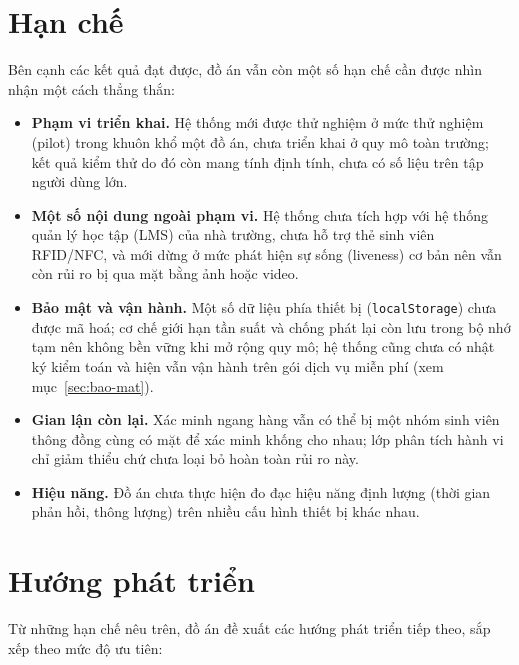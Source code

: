 \documentclass[../main.tex]{subfiles}
\begin{document}
\section{Hạn chế}
\label{sec:han-che}

Bên cạnh các kết quả đạt được, đồ án vẫn còn một số hạn chế cần được nhìn nhận một cách thẳng
thắn:

\begin{itemize}[leftmargin=1.5em]
  \item \textbf{Phạm vi triển khai.} Hệ thống mới được thử nghiệm ở mức thử nghiệm (pilot)
  trong khuôn khổ một đồ án, chưa triển khai ở quy mô toàn trường; kết quả kiểm thử do đó còn
  mang tính định tính, chưa có số liệu trên tập người dùng lớn.

  \item \textbf{Một số nội dung ngoài phạm vi.} Hệ thống chưa tích hợp với hệ thống quản lý
  học tập (LMS) của nhà trường, chưa hỗ trợ thẻ sinh viên RFID/NFC, và mới dừng ở mức phát
  hiện sự sống (liveness) cơ bản nên vẫn còn rủi ro bị qua mặt bằng ảnh hoặc video.

  \item \textbf{Bảo mật và vận hành.} Một số dữ liệu phía thiết bị (\texttt{localStorage})
  chưa được mã hoá; cơ chế giới hạn tần suất và chống phát lại còn lưu trong bộ nhớ tạm nên
  không bền vững khi mở rộng quy mô; hệ thống cũng chưa có nhật ký kiểm toán và hiện vẫn vận
  hành trên gói dịch vụ miễn phí (xem mục~\ref{sec:bao-mat}).

  \item \textbf{Gian lận còn lại.} Xác minh ngang hàng vẫn có thể bị một nhóm sinh viên thông
  đồng cùng có mặt để xác minh khống cho nhau; lớp phân tích hành vi chỉ giảm thiểu chứ chưa
  loại bỏ hoàn toàn rủi ro này.

  \item \textbf{Hiệu năng.} Đồ án chưa thực hiện đo đạc hiệu năng định lượng (thời gian phản
  hồi, thông lượng) trên nhiều cấu hình thiết bị khác nhau.
\end{itemize}

\section{Hướng phát triển}
\label{sec:huong-phat-trien}

Từ những hạn chế nêu trên, đồ án đề xuất các hướng phát triển tiếp theo, sắp xếp theo mức độ
ưu tiên:
\end{document}
